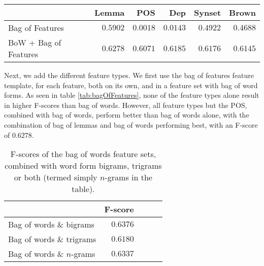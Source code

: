 \documentclass[11pt,letterpaper]{article}
\begin{document}
\begin{table*}
  \begin{center}
    \begin{tabular}{lrrrrr}
      \toprule
      
      & Lemma & POS & Dep & Synset & Brown\\ %
      \midrule
      Bag of Features & $0.5902$ & $0.0018$   &  $0.0143$ & $0.4922$ & $0.4688$ \\ %
      BoW + Bag of Features & $0.6278$ & $0.6071$ & $0.6185$ & $0.6176$ & $0.6145$\\ %
      
      \bottomrule

    \end{tabular}
  \end{center}
  \caption{Results of bag of feature variations with different feature types. The results shown are the F-scores of each feature set after tuning, using the MaxEnt classifier.}
  \label{tab:bagOfFeatures}
\end{table*}


Next, we add the different feature types. We first use the bag of features feature template, for each feature, both on its own, and in a feature set with bag of word forms. As seen in table \ref{tab:bagOfFeatures}, none of the feature types alone result in higher F-scores than bag of words. However, all feature types but the POS, combined with bag of words, perform better than bag of words alone, with the combination of bag of lemmas and bag of words performing best, with an F-score of $0.6278$.

\begin{table}
  \begin{center}
    \begin{tabular}{lrrrr}
      \toprule
      
      & F-score \\
      \midrule
      Bag of words \& bigrams & $0.6376$ \\
      Bag of words \& trigrams & $0.6180$ \\
      Bag of words \& $n$-grams & $0.6337$ \\
      \bottomrule

    \end{tabular}
  \end{center}
  \caption{F-scores of the bag of words feature sets, combined with word form bigrams, trigrams or both (termed simply $n$-grams in the table).}
  \label{tab:ngrams}
\end{table}
\end{document}
